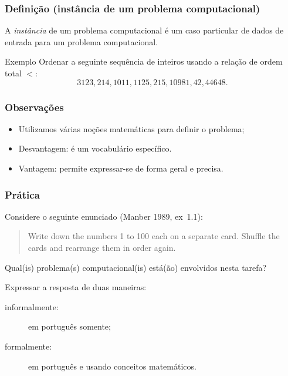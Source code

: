 \documentclass{beamer}
\begin{document}
\begin{frame}
  \frametitle{Definição (instância de um problema computacional)}

  A \emph{instância} de um problema computacional é um caso particular de dados
  de entrada para um problema computacional.

  \begin{block}{Exemplo}
    Ordenar a seguinte sequência de inteiros usando a relação de ordem total $<$:
    \[
    3123, 214, 1011, 1125, 215, 10981, 42, 44648.
    \]
    \end{block}
\end{frame}

\begin{frame}
  \frametitle{Observações}

  \begin{itemize}
    \item Utilizamos várias noções matemáticas para definir o problema;
    \item Desvantagem: é um vocabulário específico.
    \item Vantagem: permite expressar-se de forma geral e precisa.
    \end{itemize}
\end{frame}

\begin{frame}
  \frametitle{Prática}

  Considere o seguinte enunciado (Manber 1989, ex~1.1):

  \begin{quote}
    Write down the numbers 1 to 100 each on a separate card. Shuffle the cards
    and rearrange them in order again.
  \end{quote}
  
  Qual(is) problema(s) computacional(is) está(ão) envolvidos nesta tarefa? 

  Expressar a resposta de duas maneiras:
  \begin{description}
  \item[informalmente:] em português somente;
  \item[formalmente:] em português e usando conceitos matemáticos.
  \end{description}
  
\end{frame}
\end{document}
